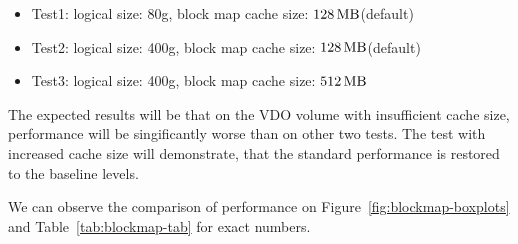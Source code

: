 \documentclass[
  color, %
  table, %
  lof,   %
  lot,   %
]{fithesis3}
\begin{document}




\begin{itemize}
    \item Test1: logical size: 80g, block map cache size: $\SI{128}{\mega\byte}$(default)
    \item Test2: logical size: 400g, block map cache size: $\SI{128}{\mega\byte}$(default)
    \item Test3: logical size: 400g, block map cache size: $\SI{512}{\mega\byte}$ 
\end{itemize}

The expected results will be that on the VDO volume with insufficient cache size, performance will be singificantly worse than on other two tests. The test with increased cache size will demonstrate, that the standard performance is restored to the baseline levels.

We can observe the comparison of performance on Figure~\ref{fig:blockmap-boxplots} and Table~\ref{tab:blockmap-tab} for exact numbers.
\end{document}
